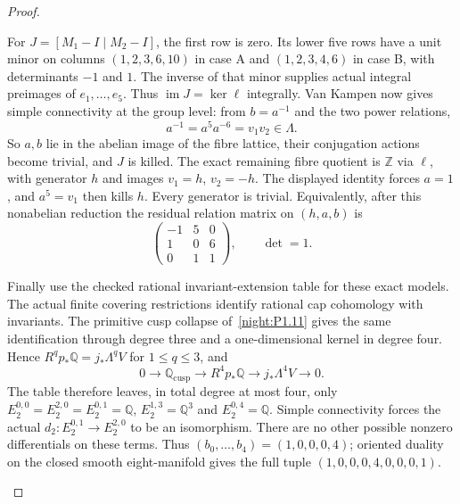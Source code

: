 \documentclass[11pt,a4paper]{article}
\theoremstyle{definition}
\begin{document}
\begin{proof}
\begin{enumerate}[label=\arabic*.]
For $J=[M_1-I\mid M_2-I]$, the first row is zero. Its lower five
rows have a unit minor on columns $(1,2,3,6,10)$ in case A and
$(1,2,3,4,6)$ in case B, with determinants $-1$ and $1$.
The inverse of that minor supplies actual integral preimages of
$e_1,\ldots,e_5$. Thus
$\operatorname{im}J=\ker\ell$ integrally. Van Kampen now gives
simple connectivity at the group level: from $b=a^{-1}$ and the
two power relations,
\[
 a^{-1}=a^5a^{-6}=v_1v_2\in\Lambda.
\]
So $a,b$ lie in the abelian image of the fibre lattice, their
conjugation actions become trivial, and $J$ is killed. The exact
remaining fibre quotient is $\mathbb Z$ via $\ell$, with generator
$h$ and images $v_1=h$, $v_2=-h$. The displayed identity forces
$a=1$, and $a^5=v_1$ then kills $h$. Every generator is trivial.
Equivalently, after this nonabelian reduction the residual relation
matrix on $(h,a,b)$ is
\[
 \begin{pmatrix}-1&5&0\\1&0&6\\0&1&1\end{pmatrix},
 \qquad\det=1.
\]

Finally use the checked rational invariant-extension table for these
exact models. The actual finite covering restrictions identify
rational cap cohomology with invariants. The primitive cusp collapse
of~\ref{night:P1.11} gives the same identification through degree
three and a one-dimensional kernel in degree four. Hence
$R^q p_*\mathbb Q=j_*\Lambda^qV$ for $1\le q\le3$, and
\[
 0\longrightarrow\mathbb Q_{\mathrm{cusp}}
 \longrightarrow R^4p_*\mathbb Q
 \longrightarrow j_*\Lambda^4V\longrightarrow0.
\]
The table therefore leaves, in total degree at most four, only
$E_2^{0,0}=E_2^{2,0}=E_2^{0,1}=\mathbb Q$,
$E_2^{1,3}=\mathbb Q^3$ and $E_2^{0,4}=\mathbb Q$.
Simple connectivity forces the actual
$d_2:E_2^{0,1}\to E_2^{2,0}$ to be an isomorphism. There are no
other possible nonzero differentials on these terms. Thus
$(b_0,\ldots,b_4)=(1,0,0,0,4)$; oriented duality on the closed
smooth eight-manifold gives the full tuple
$(1,0,0,0,4,0,0,0,1)$.
\end{enumerate}
\end{proof}
\end{document}
